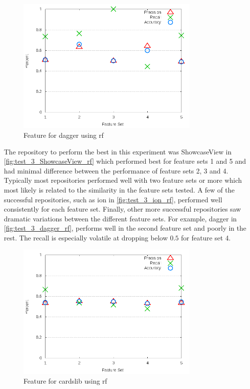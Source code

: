 \begin{figure}[!ht]
    \centering
        \includegraphics[width=0.8\textwidth]{images/rf/test_3/dagger_sample_range}
        \caption{Feature for dagger using \gls{rf}}
        \label{fig:test_3_dagger_rf}
\end{figure}

The repository to perform the best in this experiment was ShowcaseView in \autoref{fig:test_3_ShowcaseView_rf} which performed best for feature sets 1 and 5 and had minimal difference between the performance of feature sets 2, 3 and 4. Typically most repositories performed well with two feature sets or more which most likely is related to the similarity in the feature sets tested. A few of the successful repositories, such as ion in \autoref{fig:test_3_ion_rf}, performed well consistently for each feature set. Finally, other more successful repositories saw dramatic variations between the different feature sets. For example, dagger in \autoref{fig:test_3_dagger_rf}, performs well in the second feature set and poorly in the rest. The recall is especially volatile at dropping below $0.5$ for feature set 4. 


\begin{figure}[!ht]
    \centering
        \includegraphics[width=0.8\textwidth]{images/rf/test_3/cardslib_sample_range}
        \caption{Feature for cardslib using \gls{rf}}
        \label{fig:test_3_cardslib_rf}
\end{figure}

